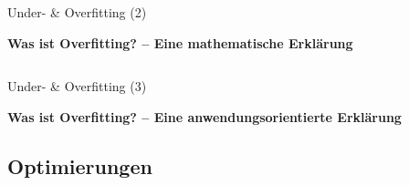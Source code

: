 \begin{frame}{Under- \& Overfitting (2)}

\textbf{Was ist Overfitting? -- Eine mathematische Erklärung}\\[1em]
      
\setlength{} 
\setlength{} 

\begin{columns}[t]
    \begin{column}{0.5\linewidth} \pause
        \centering 
         
    \end{column}
    \begin{column}{0.5\linewidth} \pause
        \centering 
         
    \end{column}
\end{columns}

\begin{columns}[t]
    \begin{column}{0.5\linewidth} \pause
        \centering 
     
    \end{column}
    \begin{column}{0.5\linewidth} \pause
        \centering 
     
    \end{column}
\end{columns}


\end{frame}







\begin{frame}{Under- \& Overfitting (3)}

\textbf{Was ist Overfitting? -- Eine anwendungsorientierte Erklärung}\\[1em]

    \centering 
    \setlength{} 
    \setlength{} 
     
\end{frame}



\subsection{Optimierungen}

